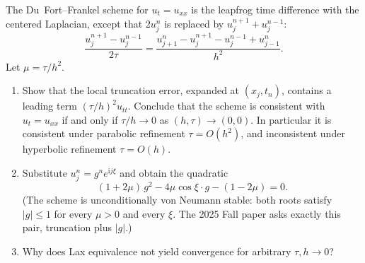 \documentclass[11pt,a4paper]{article}
\begin{document}
\begin{exercise}
\label{exer:dufort}
The Du~Fort--Frankel scheme for \(u_t=u_{xx}\) is the leapfrog time difference with the centered Laplacian, except that \(2u_j^n\) is replaced by \(u_j^{n+1}+u_j^{n-1}\):
\[
\frac{u_j^{n+1}-u_j^{n-1}}{2\tau}
=
\frac{u_{j+1}^n-u_j^{n+1}-u_j^{n-1}+u_{j-1}^n}{h^2}.
\]
Let \(\mu=\tau/h^2\).
\begin{enumerate}[label=\textup{(\alph*)}]
    \item Show that the local truncation error, expanded at \((x_j,t_n)\), contains a leading term \((\tau/h)^2 u_{tt}\). Conclude that the scheme is consistent with \(u_t=u_{xx}\) if and only if \(\tau/h\to 0\) as \((h,\tau)\to(0,0)\). In particular it is consistent under parabolic refinement \(\tau=O(h^2)\), and inconsistent under hyperbolic refinement \(\tau=O(h)\).
    \item Substitute \(u_j^n=g^n e^{\mathrm i j\xi}\) and obtain the quadratic
    \[
    (1+2\mu)\,g^2
    -
    4\mu\cos\xi\cdot g
    -
    (1-2\mu)
    =0.
    \]
    (The scheme is unconditionally von Neumann stable: both roots satisfy \(|g|\le 1\) for every \(\mu>0\) and every \(\xi\). The 2025 Fall paper asks exactly this pair, truncation plus \(|g|\).)
    \item Why does Lax equivalence not yield convergence for arbitrary \(\tau,h\to 0\)?
\end{enumerate}
\end{exercise}
\end{document}
